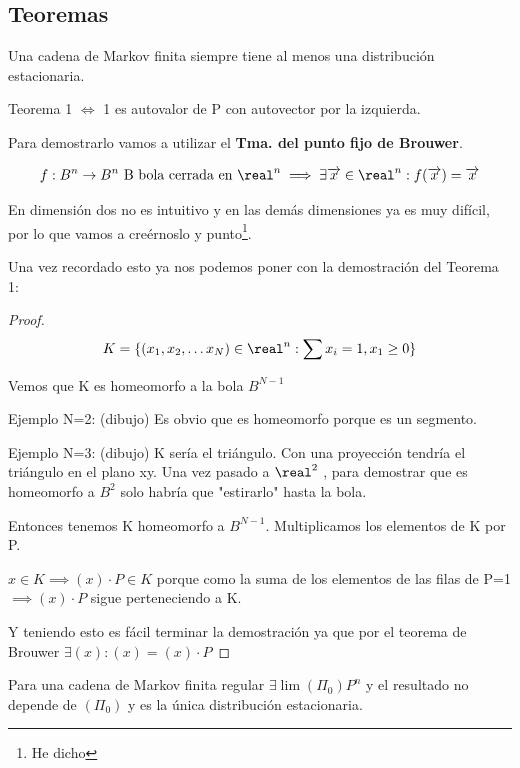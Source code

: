 \subsection{Teoremas}
\begin{theorem}[Teorema 1]
	\label{Markov_tma1}
	Una cadena de Markov finita siempre tiene al menos una distribución estacionaria.
\end{theorem}

	\obs Teorema 1 $\iff$ 1 es autovalor de P con autovector por la izquierda.


	Para demostrarlo vamos a utilizar el \textbf{Tma. del punto fijo de Brouwer}.

	\begin{theorem}
	\[f: B^n \rightarrow B^n  \text{  B bola cerrada en }\real^n \implies \exists \overrightarrow x \in \real^n : f(\overrightarrow x ) = \overrightarrow x\]
	\end{theorem}

	En dimensión dos no es intuitivo y en las demás dimensiones ya es muy difícil, por lo que vamos a creérnoslo y punto\footnote{He dicho}.

	Una vez recordado esto ya nos podemos poner con la demostración del Teorema 1:
	\begin{proof}
	$$K = \{(x_1 , x_2, \ldots x_N) \in \real^n : \sum x_i = 1 , x_1 \geq 0\}$$

	Vemos que K es homeomorfo a la bola $B^{N-1}$

	Ejemplo N=2:
	(dibujo)
	Es obvio que es homeomorfo porque es un segmento.

	Ejemplo N=3:
	(dibujo)
	K sería el triángulo. Con una proyección tendría el triángulo en el plano xy.
	Una vez pasado a $\real^2$ , para demostrar que es homeomorfo a $B^2$ solo habría que "estirarlo" hasta la bola.

	Entonces tenemos K homeomorfo a $B^{N-1}$. Multiplicamos los elementos de K por P.

	$x \in K \implies (x)\cdot P \in K$ porque como la suma de los elementos de las filas de P=1 $\implies (x)\cdot P$ sigue perteneciendo a K.

	Y teniendo esto es fácil terminar la demostración ya que por el teorema de Brouwer $\exists (x) : (x) = (x)\cdot P$
\end{proof}
\newpage
\begin{theorem}[Teorema 2]
	\label{Markov_tma2}
	Para una cadena de Markov finita regular $\exists \lim (\Pi_0) P^n$ y el resultado no depende de $(\Pi_0)$ y es la única distribución estacionaria.
\end{theorem}

